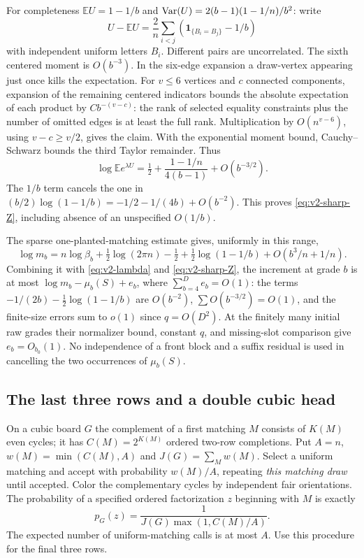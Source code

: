 For completeness $\mathbb EU=1-1/b$ and
$\operatorname{Var}(U)=2(b-1)(1-1/n)/b^2$: write
\[
 U-\mathbb EU=\frac2n\sum_{i<j}(\mathbf1_{\{B_i=B_j\}}-1/b)
\]
with independent uniform letters $B_i$. Different pairs are uncorrelated.
The sixth centered moment is $O(b^{-3})$. In the six-edge expansion a
draw-vertex appearing just once kills the expectation. For $v\le6$
vertices and $c$ connected components, expansion of the remaining centered
indicators bounds the absolute expectation of each product by
$C b^{-(v-c)}$: the rank of selected equality constraints plus the number
of omitted edges is at least the full rank. Multiplication by
$O(n^{v-6})$, using $v-c\ge v/2$, gives the claim. With the exponential
moment bound, Cauchy--Schwarz bounds the third Taylor remainder. Thus
\[
 \log\mathbb E e^{\lambda U}
    =\tfrac12+\frac{1-1/n}{4(b-1)}+O(b^{-3/2}).
\]
The $1/b$ term cancels the one in
$(b/2)\log(1-1/b)=-1/2-1/(4b)+O(b^{-2})$. This proves
\eqref{eq:v2-sharp-Z}, including absence of an unspecified $O(1/b)$.

The sparse one-planted-matching estimate gives, uniformly in this range,
\[
 \log m_b=n\log\beta_b+\tfrac12\log(2\pi n)-\tfrac12
                 +\tfrac12\log(1-1/b)+O(b^3/n+1/n).
\]
Combining it with \eqref{eq:v2-lambda} and \eqref{eq:v2-sharp-Z}, the
increment at grade $b$ is at most $\log m_b-\mu_b(S)+e_b$, where
$\sum_{b=4}^D e_b=O(1)$: the terms $-1/(2b)-\tfrac12\log(1-1/b)$
are $O(b^{-2})$, $\sum O(b^{-3/2})=O(1)$, and the finite-size errors
sum to $o(1)$ since $q=O(D^2)$. At the finitely many initial raw grades
their normalizer bound, constant $q$, and missing-slot comparison give
$e_b=O_{b_0}(1)$. No independence of a front block and a suffix residual
is used in cancelling the two occurrences of $\mu_b(S)$.

\subsection{The last three rows and a double cubic head}

On a cubic board $G$ the complement of a first matching $M$ consists of
$K(M)$ even cycles; it has $C(M)=2^{K(M)}$ ordered two-row completions.
Put $A=n$, $w(M)=\min(C(M),A)$ and $J(G)=\sum_M w(M)$. Select a
uniform matching and accept with probability $w(M)/A$, repeating
\emph{this matching draw} until accepted. Color the complementary cycles
by independent fair orientations. The probability of a specified ordered
factorization $z$ beginning with $M$ is exactly
\begin{equation}\label{eq:v2-cap-cubic}
 p_G(z)=\frac{1}{J(G)\max(1,C(M)/A)}.
\end{equation}
The expected number of uniform-matching calls is at most $A$. Use this
procedure for the final three rows.


